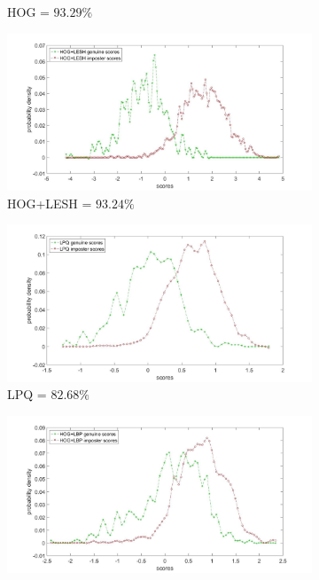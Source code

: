\documentclass[english, 12pt]{article}
\begin{document}
\begin{figure}[H]
\begin{subfigure}[b]{0.44\textwidth}
        \caption{HOG = $93.29\%$}
        \label{fig:HOG}
    \end{subfigure}
    \begin{subfigure}[b]{0.44\textwidth}
        \includegraphics[width=\textwidth]{HOG+LESH.jpg}
        \caption{HOG+LESH = $93.24\%$}
        \label{fig:HOGLESH}
    \end{subfigure}
        \begin{subfigure}[b]{0.44\textwidth}
        \includegraphics[width=\textwidth]{LPQ.jpg}
        \caption{LPQ = $82.68\%$}
        \label{fig:LPQ}
    \end{subfigure}
    \begin{subfigure}[b]{0.44\textwidth}
        \includegraphics[width=\textwidth]{HOG+LBP.jpg}

\end{subfigure}
\end{figure}
\end{document}
